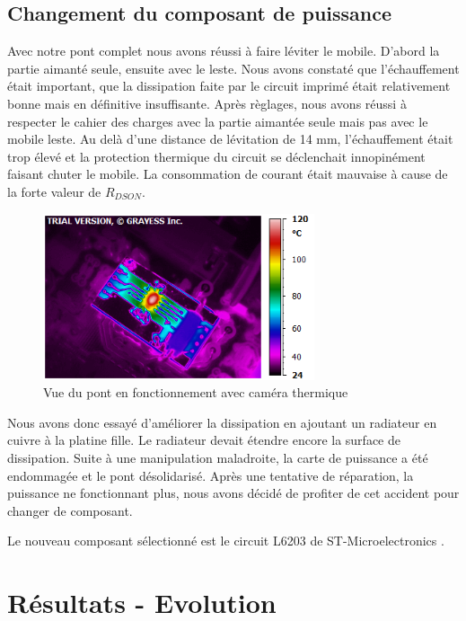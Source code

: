 \documentclass[11pt, french]{article} %
\begin{document}
\subsection{Changement du composant de puissance}
Avec notre pont complet nous avons réussi à faire léviter le mobile. D'abord la partie aimanté seule, ensuite avec le leste. Nous avons constaté que l'échauffement était important, que la dissipation faite par le circuit imprimé était relativement bonne mais en définitive insuffisante. Après règlages, nous avons réussi à respecter le cahier des charges avec la partie aimantée seule mais pas avec le mobile leste. Au delà d'une distance de lévitation de 14 mm, l'échauffement était trop élevé et la protection thermique du circuit se déclenchait innopinément faisant chuter le mobile. La consommation de courant était mauvaise à cause de la forte valeur de $ R_{DSON} $.

\begin{figure}[ht!]
	\centering
	\includegraphics[width = 8cm]{SolutionAnalogique/VueThermique.png}
	\caption{Vue du pont en fonctionnement avec caméra thermique}
\end{figure}

Nous avons donc essayé d'améliorer la dissipation en ajoutant un radiateur en cuivre à la platine fille. Le radiateur devait étendre encore la surface de dissipation. Suite à une manipulation maladroite, la carte de puissance a été endommagée et le pont désolidarisé. Après une tentative de réparation, la puissance ne fonctionnant plus, nous avons décidé de profiter de cet accident pour changer de composant.

Le nouveau composant sélectionné est le circuit L6203 de ST-Microelectronics .

\section{Résultats - Evolution}
\end{document}
